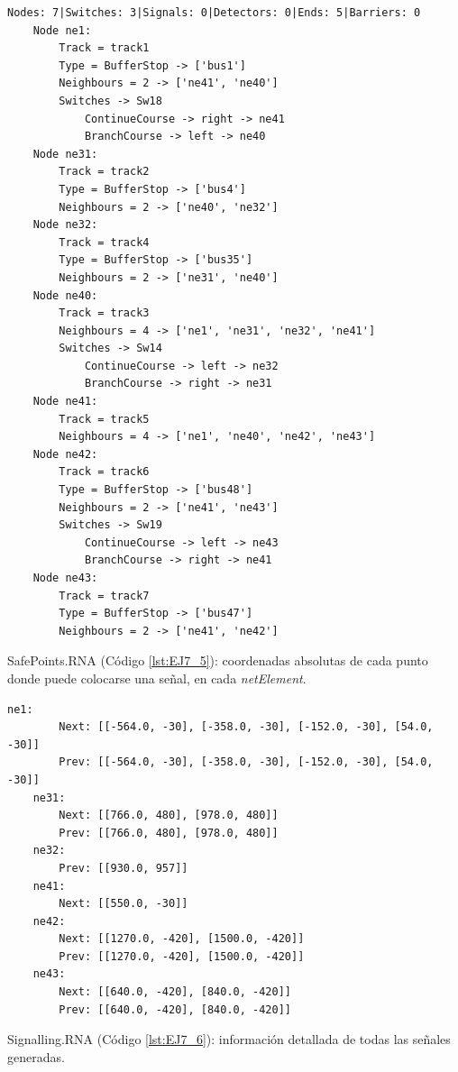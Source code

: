 	\begin{lstlisting}[language = {}, caption = Infrastructure.RNA, label = {lst:EJ1_4}]
	Nodes: 7|Switches: 3|Signals: 0|Detectors: 0|Ends: 5|Barriers: 0
	Node ne1:
		Track = track1
		Type = BufferStop -> ['bus1']
		Neighbours = 2 -> ['ne41', 'ne40']
		Switches -> Sw18
			ContinueCourse -> right -> ne41
			BranchCourse -> left -> ne40
	Node ne31:
		Track = track2
		Type = BufferStop -> ['bus4']
		Neighbours = 2 -> ['ne40', 'ne32']
	Node ne32:
		Track = track4
		Type = BufferStop -> ['bus35']
		Neighbours = 2 -> ['ne31', 'ne40']
	Node ne40:
		Track = track3
		Neighbours = 4 -> ['ne1', 'ne31', 'ne32', 'ne41']
		Switches -> Sw14
			ContinueCourse -> left -> ne32
			BranchCourse -> right -> ne31
	Node ne41:
		Track = track5
		Neighbours = 4 -> ['ne1', 'ne40', 'ne42', 'ne43']
	Node ne42:
		Track = track6
		Type = BufferStop -> ['bus48']
		Neighbours = 2 -> ['ne41', 'ne43']
		Switches -> Sw19
			ContinueCourse -> left -> ne43
			BranchCourse -> right -> ne41
	Node ne43:
		Track = track7
		Type = BufferStop -> ['bus47']
		Neighbours = 2 -> ['ne41', 'ne42']
	\end{lstlisting}
	
	SafePoints.RNA (Código \ref{lst:EJ7_5}): coordenadas absolutas de cada punto donde puede colocarse una señal, en cada \textit{netElement}.
	
	\begin{lstlisting}[language = {}, caption = SafePoints.RNA, label = {lst:EJ7_5}]
	ne1:
		Next: [[-564.0, -30], [-358.0, -30], [-152.0, -30], [54.0, -30]]
		Prev: [[-564.0, -30], [-358.0, -30], [-152.0, -30], [54.0, -30]]
	ne31:
		Next: [[766.0, 480], [978.0, 480]]
		Prev: [[766.0, 480], [978.0, 480]]
	ne32:
		Prev: [[930.0, 957]]
	ne41:
		Next: [[550.0, -30]]
	ne42:
		Next: [[1270.0, -420], [1500.0, -420]]
		Prev: [[1270.0, -420], [1500.0, -420]]
	ne43:
		Next: [[640.0, -420], [840.0, -420]]
		Prev: [[640.0, -420], [840.0, -420]]
	\end{lstlisting}
	
	Signalling.RNA (Código \ref{lst:EJ7_6}): información detallada de todas las señales generadas.
	

